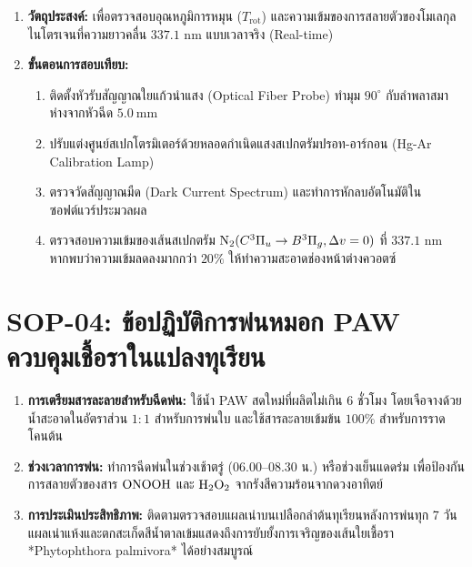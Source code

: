 \begin{enumerate}[leftmargin=2.0em, itemsep=6pt]
    \item \textbf{วัตถุประสงค์:} เพื่อตรวจสอบอุณหภูมิการหมุน ($T_{\text{rot}}$) และความเข้มของการสลายตัวของโมเลกุลไนโตรเจนที่ความยาวคลื่น $337.1\text{ nm}$ แบบเวลาจริง (Real-time)
    \item \textbf{ขั้นตอนการสอบเทียบ:}
    \begin{enumerate}[label=\arabic*., leftmargin=1.5em, itemsep=3pt]
        \item ติดตั้งหัวรับสัญญาณใยแก้วนำแสง (Optical Fiber Probe) ทำมุม $90^\circ$ กับลำพลาสมา ห่างจากหัวฉีด $5.0\ \si{\milli\meter}$
        \item ปรับแต่งศูนย์สเปกโตรมิเตอร์ด้วยหลอดกำเนิดแสงสเปกตรัมปรอท-อาร์กอน (Hg-Ar Calibration Lamp)
        \item ตรวจวัดสัญญาณมืด (Dark Current Spectrum) และทำการหักลบอัตโนมัติในซอฟต์แวร์ประมวลผล
        \item ตรวจสอบความเข้มของเส้นสเปกตรัม $\ce{N2}(C^3\Pi_u \to B^3\Pi_g, \Delta v = 0)$ ที่ $337.1\text{ nm}$ หากพบว่าความเข้มลดลงมากกว่า $20\%$ ให้ทำความสะอาดช่องหน้าต่างควอตซ์
    \end{enumerate}
\end{enumerate}

\section{SOP-04: ข้อปฏิบัติการพ่นหมอก PAW ควบคุมเชื้อราในแปลงทุเรียน}
\label{app:sop_durian}


\begin{enumerate}[leftmargin=2.0em, itemsep=6pt]
    \item \textbf{การเตรียมสารละลายสำหรับฉีดพ่น:} ใช้น้ำ PAW สดใหม่ที่ผลิตไม่เกิน $6\text{ ชั่วโมง}$ โดยเจือจางด้วยน้ำสะอาดในอัตราส่วน $1:1$ สำหรับการพ่นใบ และใช้สารละลายเข้มข้น $100\%$ สำหรับการราดโคนต้น
    \item \textbf{ช่วงเวลาการพ่น:} ทำการฉีดพ่นในช่วงเช้าตรู่ ($06.00$--$08.30\text{ น.}$) หรือช่วงเย็นแดดร่ม เพื่อป้องกันการสลายตัวของสาร $\ce{ONOOH}$ และ $\ce{H2O2}$ จากรังสีความร้อนจากดวงอาทิตย์
    \item \textbf{การประเมินประสิทธิภาพ:} ติดตามตรวจสอบแผลเน่าบนเปลือกลำต้นทุเรียนหลังการพ่นทุก 7 วัน แผลเน่าแห้งและตกสะเก็ดสีน้ำตาลเข้มแสดงถึงการยับยั้งการเจริญของเส้นใยเชื้อรา *Phytophthora palmivora* ได้อย่างสมบูรณ์
\end{enumerate}

\clearpage
